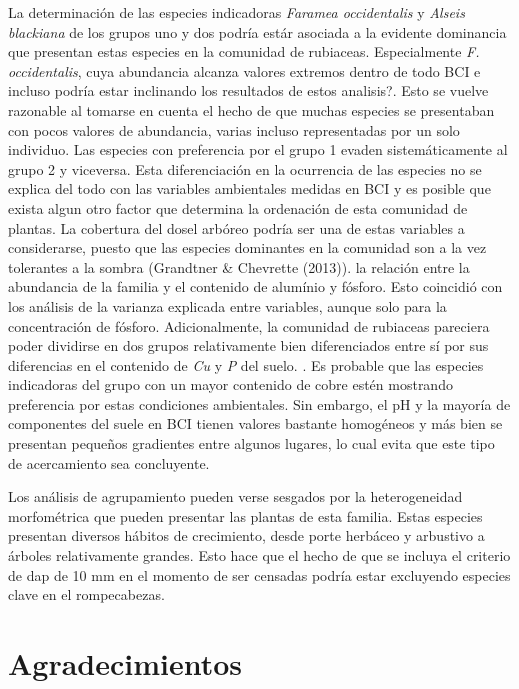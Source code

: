 \documentclass[11pt,]{article}
\begin{document}
La determinación de las especies indicadoras \emph{Faramea occidentalis}
y \emph{Alseis blackiana} de los grupos uno y dos podría estár asociada
a la evidente dominancia que presentan estas especies en la comunidad de
rubiaceas. Especialmente \emph{F. occidentalis}, cuya abundancia alcanza
valores extremos dentro de todo BCI e incluso podría estar inclinando
los resultados de estos analisis?. Esto se vuelve razonable al tomarse
en cuenta el hecho de que muchas especies se presentaban con pocos
valores de abundancia, varias incluso representadas por un solo
individuo. Las especies con preferencia por el grupo 1 evaden
sistemáticamente al grupo 2 y viceversa. Esta diferenciación en la
ocurrencia de las especies no se explica del todo con las variables
ambientales medidas en BCI y es posible que exista algun otro factor que
determina la ordenación de esta comunidad de plantas. La cobertura del
dosel arbóreo podría ser una de estas variables a considerarse, puesto
que las especies dominantes en la comunidad son a la vez tolerantes a la
sombra (Grandtner \& Chevrette (2013)). la relación entre la abundancia
de la familia y el contenido de alumínio y fósforo. Esto coincidió con
los análisis de la varianza explicada entre variables, aunque solo para
la concentración de fósforo. Adicionalmente, la comunidad de rubiaceas
pareciera poder dividirse en dos grupos relativamente bien diferenciados
entre sí por sus diferencias en el contenido de \emph{Cu} y \emph{P} del
suelo. . Es probable que las especies indicadoras del grupo con un mayor
contenido de cobre estén mostrando preferencia por estas condiciones
ambientales. Sin embargo, el pH y la mayoría de componentes del suele en
BCI tienen valores bastante homogéneos y más bien se presentan pequeños
gradientes entre algunos lugares, lo cual evita que este tipo de
acercamiento sea concluyente.

Los análisis de agrupamiento pueden verse sesgados por la heterogeneidad
morfométrica que pueden presentar las plantas de esta familia. Estas
especies presentan diversos hábitos de crecimiento, desde porte herbáceo
y arbustivo a árboles relativamente grandes. Esto hace que el hecho de
que se incluya el criterio de dap de 10 mm en el momento de ser censadas
podría estar excluyendo especies clave en el rompecabezas.

\section{Agradecimientos}\label{agradecimientos}
\end{document}
